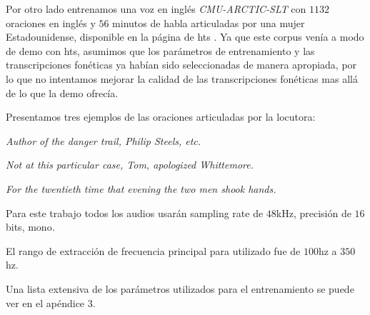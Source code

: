 Por otro lado entrenamos una voz en inglés \textit{CMU-ARCTIC-SLT}\cite{cmuArtic} con $1132$ oraciones en inglés y $56$ minutos de habla articuladas por una mujer Estadounidense, disponible en la página de hts \cite{hts}. Ya que este corpus venía a modo de demo con hts, asumimos que los parámetros de entrenamiento y las transcripciones fonéticas ya habían sido seleccionadas de manera apropiada, por lo que no intentamos mejorar la calidad de las transcripciones fonéticas mas allá de lo que la demo ofrecía.

Presentamos tres ejemplos de las oraciones articuladas por la locutora:

\indent\indent \textit{Author of the danger trail, Philip Steels, etc.}

\indent\indent \textit{Not at this particular case, Tom, apologized Whittemore.}

\indent\indent \textit{For the twentieth time that evening the two men shook hands.}

Para este trabajo todos los audios usarán sampling rate de $48$kHz, precisión de $16$bits, mono.

El rango de extracción de frecuencia principal para  utilizado fue de $100$hz a $350$hz.

Una lista extensiva de los parámetros utilizados para el entrenamiento se puede ver en el apéndice $3$.

